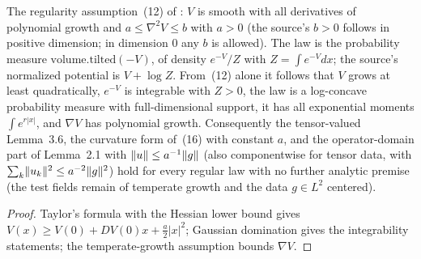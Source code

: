 \begin{lemma}
  \label{lem:bkl-regular-law}
  \leanok
  The regularity assumption~(12) of \cite{BizeulKlartagLehec2026}: $V$ is smooth with all derivatives
  of polynomial growth and $a\le\nabla^2V\le b$ with $a>0$ (the source's $b>0$ follows in positive
  dimension; in dimension $0$ any $b$ is allowed).  The law is the probability measure
  $\mathrm{volume}.\mathrm{tilted}(-V)$, of density $e^{-V}/Z$ with $Z=\int e^{-V}dx$; the source's
  normalized potential is $V+\log Z$.  From~(12) alone it follows that $V$ grows at least quadratically, $e^{-V}$
  is integrable with $Z>0$, the law is a log-concave probability measure with full-dimensional support,
  it has all exponential moments $\int e^{r|x|}$, and $\nabla V$ has polynomial growth.  Consequently
  the tensor-valued Lemma~3.6, the curvature form of~(16) with constant $a$, and the operator-domain
  part of Lemma~2.1 with $\lVert u\rVert\le a^{-1}\lVert g\rVert$ (also componentwise for tensor data, with
  $\sum_k\lVert u_k\rVert^2\le a^{-2}\lVert g\rVert^2$) hold for every regular law with no further analytic
  premise (the test fields remain of temperate growth and the data $g\in L^2$ centered).
\end{lemma}
\begin{proof}
  \leanok
  Taylor's formula with the Hessian lower bound gives $V(x)\ge V(0)+DV(0)x+\tfrac a2|x|^2$; Gaussian
  domination gives the integrability statements; the temperate-growth assumption bounds $\nabla V$.
\end{proof}

